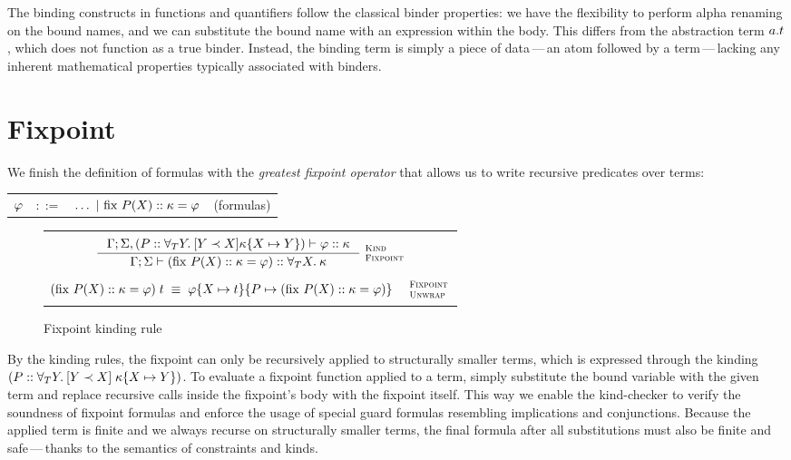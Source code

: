 \documentclass[english, mgr]{iithesis}
\renewcommand{\it}[1]{\textit{#1}}
\newcommand{\fix}[3]{\ensuremath{\text{fix }#1(#2)\ofkind#3=}}\newcommand{\myatop}[2]{\ensuremath{\genfrac{}{}{0pt}{}{#1\hfill}{#2\hfill}}}
\newcommand{\scbrk}[2]{\myatop{\textsc{#1}}{\textsc{#2}}}
\newcommand{\mdash}{\,---\,}
\def\-{{\mdash}}
\begin{document}
The binding constructs in functions and quantifiers follow the classical binder properties: we have the flexibility to perform alpha renaming on the bound names, and we can substitute the bound name with an expression within the body.
This differs from the abstraction term $a.t$, which
does not function as a true binder.
Instead, the binding term is simply a piece of data\-an atom followed by a term\-lacking any inherent mathematical properties typically associated with binders.

\section{Fixpoint}
We finish the definition of formulas with the \it{greatest fixpoint operator}
that allows us to write recursive predicates over terms:
\\
\begin{tabular}{rrlr}
$\varphi$ & $::=$ & $\ldots
               \bnfor \fix{\propv}{\termv}{\kind}{\formphi} $
    & (formulas)
\end{tabular}

\begin{figure}[htpb]
  \begin{tabularx}{\textwidth}{|C|}
    \hline \\ $
\inference{
  \cEnv;\kEnv, (\propv \ofkind \kForallTerm{Y} \kGuard{Y \cshlt \termv}{\kind\subst{\termv}{Y}})\vdash \formphi \ofkind \kind
}{
  \cEnv;\kEnv\vdash (\fix{\propv}{\termv}{\kind}{\formphi}) \ofkind \kForallTerm{\termv}{\kind}
}\:\scbrk{Kind}{Fixpoint}
  $ \\ \\
  $
(\fix{\propv}{\termv}{\kind}{\formphi})\fApp\term
\;\equiv\;
\formphi\subst{\termv}{\term}\subst{\propv}{(\fix{\propv}{\termv}{\kind}{\formphi})}
\quad\:\scbrk{Fixpoint}{Unwrap}$
  \\ \\ \hline
\end{tabularx}
  \caption{Fixpoint kinding rule}
  \label{fig:fixpoint-kinding}
\end{figure}
By the kinding rules, the fixpoint can only be recursively applied to structurally smaller terms,
which is expressed through the kinding $(P :: \forall_T Y .\: [Y \prec X]{\;\kappa\{X\mapsto Y\}})$.
To evaluate a fixpoint function applied to a term, simply substitute the bound
variable with the given term and replace recursive calls inside the fixpoint's body with the fixpoint itself.
This way we enable the kind-checker to verify the soundness of fixpoint formulas
and enforce the usage of special guard formulas resembling implications and conjunctions.
Because the applied term is finite
and we always recurse on structurally smaller terms,
the final formula after all substitutions must also be finite and safe\-thanks
to the semantics of constraints and kinds.
\end{document}
